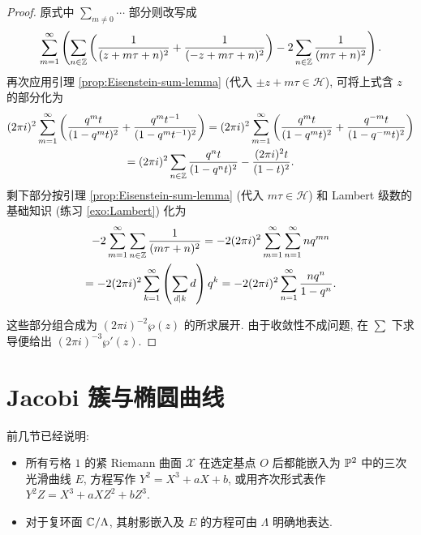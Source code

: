 \begin{proof}
	原式中 $\sum_{m \neq 0} \cdots$ 部分则改写成
	\begin{equation*}
		\sum_{m=1}^\infty \left( \sum_{n \in \mathbb{Z}} \left( \frac{1}{(z + m\tau + n)^2} + \frac{1}{(-z + m\tau + n)^2} \right) - 2\sum_{n \in \mathbb{Z}} \frac{1}{(m\tau + n)^2} \right).
	\end{equation*}
	再次应用引理 \ref{prop:Eisenstein-sum-lemma} (代入 $\pm z + m\tau \in \mathcal{H}$), 可将上式含 $z$ 的部分化为
	\begin{multline*}
		(2\pi i)^2 \sum_{m=1}^\infty \left( \dfrac{q^m t}{(1 - q^m t)^2} + \dfrac{q^m t^{-1}}{(1 - q^m t^{-1})^2} \right) = (2\pi i)^2 \sum_{m=1}^\infty  \left( \dfrac{q^m t}{(1 - q^m t)^2} + \dfrac{q^{-m} t}{(1 - q^{-m} t)^2} \right) \\
		= (2\pi i)^2 \sum_{n \in \mathbb{Z}} \dfrac{q^n t}{(1 - q^n t)^2} - \dfrac{(2\pi i)^2 t}{(1 - t)^2}.
	\end{multline*}
	剩下部分按引理 \ref{prop:Eisenstein-sum-lemma} (代入 $m\tau \in \mathcal{H}$) 和 Lambert 级数的基础知识 (练习 \ref{exo:Lambert}) 化为
	\begin{multline*}
		-2 \sum_{m=1}^\infty \sum_{n \in \mathbb{Z}} \frac{1}{(m\tau + n)^2} = -2(2\pi i)^2 \sum_{m=1}^\infty \sum_{n=1}^\infty n q^{mn} \\
		= -2(2\pi i)^2 \sum_{k=1}^\infty \left( \sum_{d \mid k} d \right) q^k = -2(2\pi i)^2 \sum_{n=1}^\infty \frac{n q^n}{1 - q^n}.
	\end{multline*}

	这些部分组合成为 $(2\pi i)^{-2} \wp(z)$ 的所求展开. 由于收敛性不成问题, 在 $\sum$ 下求导便给出 $(2\pi i)^{-3} \wp'(z)$.
\end{proof}

\section{Jacobi 簇与椭圆曲线}\label{sec:Jacobian}
前几节已经说明:
\begin{itemize}
	\item 所有亏格 $1$ 的紧 Riemann 曲面 $\mathcal{X}$ 在选定基点 $O$ 后都能嵌入为 $\mathbb{P}^2$ 中的三次光滑曲线 $E$, 方程写作 $Y^2 = X^3 + aX + b$, 或用齐次形式表作 $Y^2 Z = X^3 + aXZ^2 + bZ^3$.
	\item 对于复环面 $\mathbb{C}/\Lambda$, 其射影嵌入及 $E$ 的方程可由 $\Lambda$ 明确地表达.
\end{itemize}

